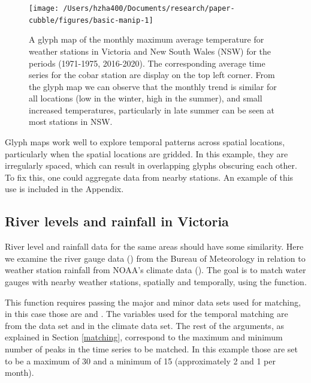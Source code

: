 \documentclass[
  shortnames]{jss}
\begin{document}
\begin{CodeChunk}
\begin{figure}

{\centering \texttt{[image: /Users/hzha400/Documents/research/paper-cubble/figures/basic-manip-1]} 

}

\caption[A glyph map of the monthly maximum average temperature for weather stations in  Victoria and New South Wales (NSW) for the periods (1971-1975, 2016-2020)]{A glyph map of the monthly maximum average temperature for weather stations in  Victoria and New South Wales (NSW) for the periods (1971-1975, 2016-2020). The corresponding average time series for the cobar station are display on the top left corner. From the glyph map we can observe that the monthly trend is similar for all locations (low in the winter, high in the summer), and small increased temperatures, particularly in late summer can be seen at most stations in NSW.}\label{fig:basic-manip}
\end{figure}
\end{CodeChunk}

Glyph maps work well to explore temporal patterns across spatial locations, particularly when the spatial locations are gridded. In this example, they are irregularly spaced, which can result in overlapping glyphs obscuring each other. To fix this, one could aggregate data from nearby stations. An example of this use is included in the Appendix.

\hypertarget{river-levels-and-rainfall-in-victoria}{%
\subsection{River levels and rainfall in Victoria}\label{river-levels-and-rainfall-in-victoria}}

River level and rainfall data for the same areas should have some similarity. Here we examine the river gauge data () from the Bureau of Meteorology \citep{bom} in relation to weather station rainfall from NOAA's climate data (). The goal is to match water gauges with nearby weather stations, spatially and temporally, using the  function.

This function requires passing the major and minor data sets used for matching, in this case those are  and . The variables used for the temporal matching are  from the  data set and  in the climate data set. The rest of the arguments, as explained in Section \ref{matching}, correspond to the maximum and minimum number of peaks in the time series to be matched. In this example those are set to be a maximum of 30 and a minimum of 15 (approximately 2 and 1 per month).
\end{document}
